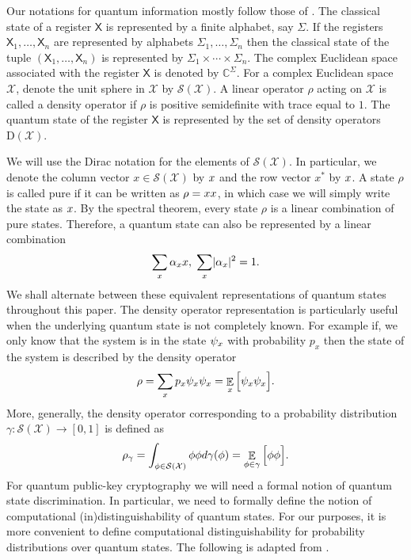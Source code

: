 \documentclass[11pt]{article}
\theoremstyle{plain}
\theoremstyle{definition}
\DeclareMathOperator{\E}{\mathbb{E}}
\DeclarePairedDelimiter{\abs}{\lvert}{\rvert}
\let\ket\relax
\DeclarePairedDelimiter{\ket}{\lvert}{\rangle}
\let\bra\relax
\DeclarePairedDelimiter{\bra}{\langle}{\rvert}
\def\C{\mathbb{C}}
\def\X{\mathcal{X}}
\def\SX{\mathcal{S(X)}}
\begin{document}
Our notations for quantum information mostly follow those of \cite{watrous2018theory}. The classical state of a register $\mathsf{X}$ is represented by a finite alphabet, say $\Sigma$. If the registers $\mathsf{X}_1, \dots, \mathsf{X}_n$ are represented by alphabets $\Sigma_1, \dots, \Sigma_n$ then the classical state of the tuple $(\mathsf{X}_1, \dots, \mathsf{X}_n)$ is represented by $\Sigma_1 \times \cdots \times \Sigma_n$. The complex Euclidean space associated with the register $\mathsf{X}$ is denoted by $\C^\Sigma$. For a complex Euclidean space $\X$, denote the unit sphere in $\X$ by $\SX$. A linear operator $\rho$ acting on $\X$ is called a density operator if $\rho$ is positive semidefinite with trace equal to $1$. The quantum state of the register $\mathsf{X}$ is represented by the set of density operators $\mathrm{D}(\X)$.

We will use the Dirac notation for the elements of $\SX$. In particular, we denote the column vector $x \in \SX$ by $\ket{x}$ and the row vector $x^*$ by $\bra{x}$. A state $\rho$ is called pure if it can be written as $\rho = \ket{x}\bra{x}$, in which case we will simply write the state as $\ket{x}$. By the spectral theorem, every state $\rho$ is a linear combination of pure states. Therefore, a quantum state can also be represented by a linear combination
\[ \sum_{x} \alpha_x \ket{x}, \hspace*{1mm} \sum_{x} \abs{\alpha_x}^2 = 1. \]
We shall alternate between these equivalent representations of quantum states throughout this paper. The density operator representation is particularly useful when the underlying quantum state is not completely known. For example if, we only know that the system is in the state $\ket{\psi_x}$ with probability $p_x$ then the state of the system is described by the density operator
\[ \rho = \sum_{x} p_x \ket{\psi_x}\bra{\psi_x} = \E_x \Big[ \ket{\psi_x} \bra{\psi_x} \Big]. \]
More, generally, the density operator corresponding to a probability distribution $\gamma: \SX \rightarrow [0, 1]$ is defined as
\[ \rho_\gamma = \int_{\ket{\phi} \in \SX} \ket{\phi}\bra{\phi} d\gamma(\ket{\phi}) = \E_{\ket{\phi} \in \gamma} \Big[ \ket{\phi}\bra{\phi} \Big]. \]
For quantum public-key cryptography we will need a formal notion of quantum state discrimination. In particular, we need to formally define the notion of computational (in)distinguishability of quantum states. For our purposes, it is more convenient to define computational distinguishability for probability distributions over quantum states. The following is adapted from \cite[3.3]{watrous2009zero}.
\end{document}

